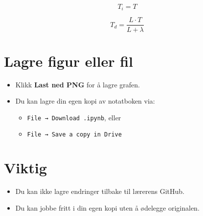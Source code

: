 \documentclass[12pt]{article}
\begin{document}
\[
T_i = T
\]

\[
T_d = \frac{L \cdot T}{L + \lambda}
\]

\section*{Lagre figur eller fil}
\begin{itemize}
    \item Klikk \textbf{Last ned PNG} for å lagre grafen.
    \item Du kan lagre din egen kopi av notatboken via:
    \begin{itemize}
        \item \texttt{File → Download .ipynb}, eller
        \item \texttt{File → Save a copy in Drive}
    \end{itemize}
\end{itemize}

\section*{Viktig}
\begin{itemize}
    \item Du kan ikke lagre endringer tilbake til lærerens GitHub.
    \item Du kan jobbe fritt i din egen kopi uten å ødelegge originalen.
\end{itemize}
\end{document}
